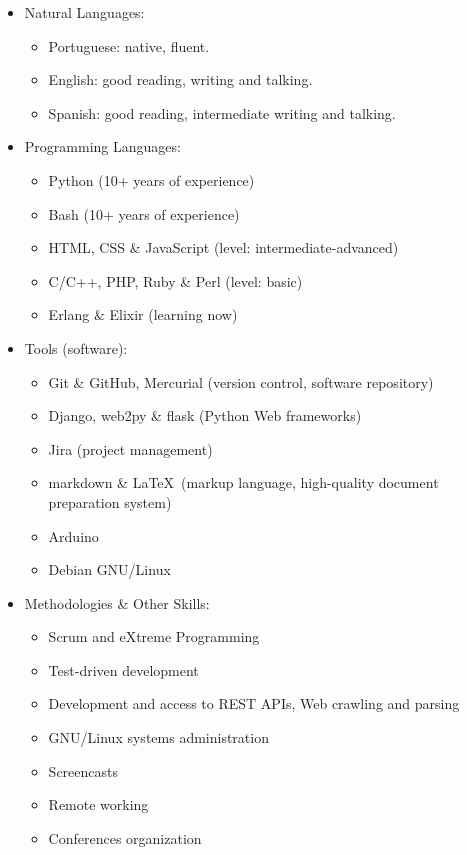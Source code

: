 \documentclass[a4paper,11pt]{article}
\begin{document}
	\begin{itemize}
		\item Natural Languages:
		\begin{itemize}
			\item Portuguese: native, fluent.
			\item English: good reading, writing and talking.
			\item Spanish: good reading, intermediate writing and talking.
		\end{itemize}
	\item Programming Languages:
		\begin{itemize}
			\item Python (10+ years of experience)
			\item Bash (10+ years of experience)
			\item HTML, CSS \& JavaScript (level: intermediate-advanced)
			\item C/C++, PHP, Ruby \& Perl (level: basic)
			\item Erlang \& Elixir (learning now)
		\end{itemize}
		\item Tools (software):
		\begin{itemize}
			\item Git \& GitHub, Mercurial (version control, software
				repository)
			\item Django, web2py \& flask (Python Web frameworks)
			\item Jira (project management)
			\item markdown \& \LaTeX\ (markup language, high-quality document
				preparation system)
			\item Arduino
			\item Debian GNU/Linux
		\end{itemize}
		\item Methodologies \& Other Skills:
		\begin{itemize}
			\item Scrum and eXtreme Programming
			\item Test-driven development
			\item Development and access to REST APIs, Web crawling and parsing
			\item GNU/Linux systems administration
			\item Screencasts
			\item Remote working
			\item Conferences organization
		\end{itemize}
	\end{itemize}
\end{document}
